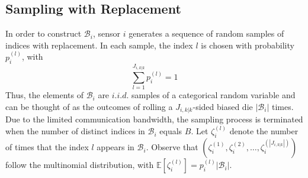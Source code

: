 \subsection{Sampling with Replacement}
In order to construct $\mathcal B_i$, sensor $i$ generates a sequence of random samples of indices with replacement. In each sample,
the index $l$ is chosen with probability $p_{i}^{(l)}$, with 
\begin{equation}
    \sum_{l=1}^{J_{i,k|k}} p_{i}^{(l)} = 1
\end{equation}
%
Thus, the elements of $\mathcal B_i$ are $i.i.d.$ samples of a categorical random variable and can be thought of as the outcomes of rolling a $J_{i,k|k}$-sided biased die $|\mathcal B_i|$ times. Due to the limited communication bandwidth, the sampling process is terminated when the number of distinct indices in $\mathcal B_i$ equals $B$.
Let $\zeta^{(l)}_{i}$ denote the number of times that the index $l$ appears in $\mathcal B_i$. Observe that $(\zeta^{(1)}_{i}, \zeta^{(2)}_{i}, \dots, \zeta^{(|J_{i,k|k}|)}_i)$ follow the multinomial distribution, with $\mathbb E[\zeta^{(l)}_{i}]=p_{i}^{(l)} |\mathcal B_i|$.

